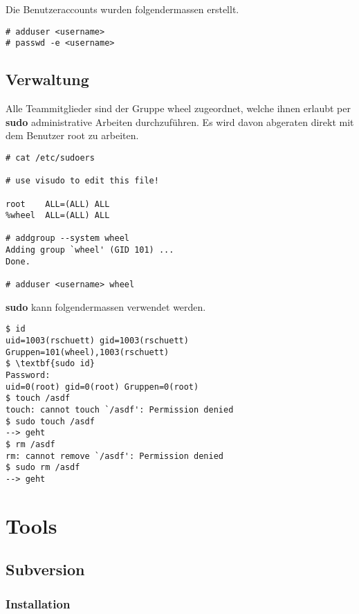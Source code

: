 \documentclass[a4paper,12pt,halfparskip,DIV14]{scrreprt}
\begin{document}
Die Benutzeraccounts wurden folgendermassen erstellt. 

\begin{verbatim}
# adduser <username>
# passwd -e <username>
\end{verbatim}


\section{Verwaltung} %
\label{sec:verwaltung}

Alle Teammitglieder sind der Gruppe wheel zugeordnet, welche ihnen erlaubt per \textbf{sudo} administrative Arbeiten durchzuführen. Es wird davon abgeraten direkt mit dem Benutzer root zu arbeiten.

\begin{verbatim}
# cat /etc/sudoers 

# use visudo to edit this file!

root    ALL=(ALL) ALL
%wheel  ALL=(ALL) ALL

# addgroup --system wheel
Adding group `wheel' (GID 101) ...
Done.

# adduser <username> wheel
\end{verbatim}

\textbf{sudo} kann folgendermassen verwendet werden.

\begin{verbatim}
$ id
uid=1003(rschuett) gid=1003(rschuett) Gruppen=101(wheel),1003(rschuett)
$ \textbf{sudo id}
Password:
uid=0(root) gid=0(root) Gruppen=0(root)
$ touch /asdf
touch: cannot touch `/asdf': Permission denied
$ sudo touch /asdf
--> geht
$ rm /asdf
rm: cannot remove `/asdf': Permission denied
$ sudo rm /asdf 
--> geht
\end{verbatim}




\chapter{Tools} %
\label{cha:tools}

\section{Subversion} %
\label{sec:subversion}

\subsection{Installation} %
\label{sub:installation-subversion}
\end{document}
